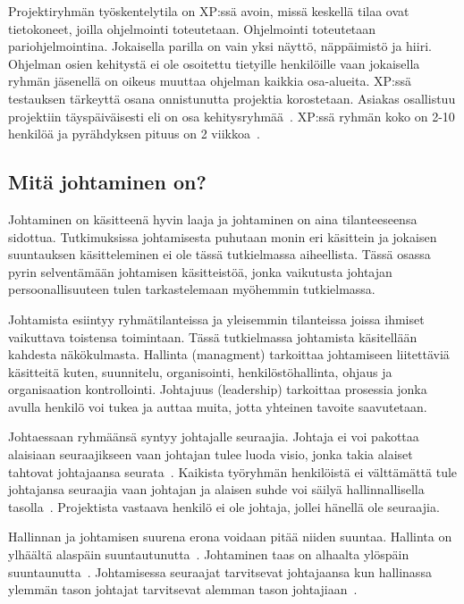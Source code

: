 \documentclass[finnish]{tktltiki2}
\theoremstyle{definition}
\theoremstyle{remark}
\begin{document}
Projektiryhmän työskentelytila on XP:ssä avoin, missä keskellä tilaa ovat tietokoneet, joilla ohjelmointi toteutetaan. Ohjelmointi toteutetaan pariohjelmointina. Jokaisella parilla on vain yksi näyttö, näppäimistö ja hiiri. Ohjelman osien kehitystä ei ole osoitettu tietyille henkilöille vaan jokaisella ryhmän jäsenellä on oikeus muuttaa ohjelman kaikkia osa-alueita. XP:ssä testauksen tärkeyttä osana onnistunutta projektia korostetaan. Asiakas osallistuu projektiin täyspäiväisesti eli on osa kehitysryhmää~\cite{796139}. XP:ssä ryhmän koko on 2-10 henkilöä ja pyrähdyksen pituus on 2 viikkoa~\cite{cohen2004introduction}. 

\subsection{Mitä johtaminen on?}

Johtaminen on käsitteenä hyvin laaja ja johtaminen on aina tilanteeseensa sidottua. Tutkimuksissa johtamisesta puhutaan monin eri käsittein ja jokaisen suuntauksen käsitteleminen ei ole tässä tutkielmassa aiheellista. Tässä osassa pyrin selventämään johtamisen käsitteistöä, jonka vaikutusta johtajan persoonallisuuteen tulen tarkastelemaan myöhemmin tutkielmassa. 

Johtamista esiintyy ryhmätilanteissa ja yleisemmin tilanteissa joissa ihmiset vaikuttava toistensa toimintaan. Tässä tutkielmassa johtamista käsitellään kahdesta näkökulmasta. Hallinta (managment) tarkoittaa johtamiseen liitettäviä käsitteitä kuten, suunnitelu, organisointi, henkilöstöhallinta, ohjaus ja organisaation kontrollointi. Johtajuus (leadership) tarkoittaa prosessia jonka avulla henkilö voi tukea ja auttaa muita, jotta yhteinen tavoite saavutetaan.

Johtaessaan ryhmäänsä syntyy johtajalle seuraajia. Johtaja ei voi pakottaa alaisiaan seuraajikseen vaan johtajan tulee luoda visio, jonka takia alaiset tahtovat johtajaansa seurata~\cite{raccoon2006leadership}. Kaikista työryhmän henkilöistä ei välttämättä tule johtajansa seuraajia vaan johtajan ja alaisen suhde voi säilyä hallinnallisella tasolla~\cite{raccoon2006leadership}. Projektista vastaava henkilö ei ole johtaja, jollei hänellä ole seuraajia. 

Hallinnan ja johtamisen suurena erona voidaan pitää niiden suuntaa. Hallinta on ylhäältä alaspäin suuntautunutta~\cite{raccoon2006leadership}. Johtaminen taas on alhaalta ylöspäin suuntaunutta~\cite{raccoon2006leadership}. Johtamisessa seuraajat tarvitsevat johtajaansa kun hallinassa ylemmän tason johtajat tarvitsevat alemman tason johtajiaan~\cite{raccoon2006leadership}. 
\end{document}

